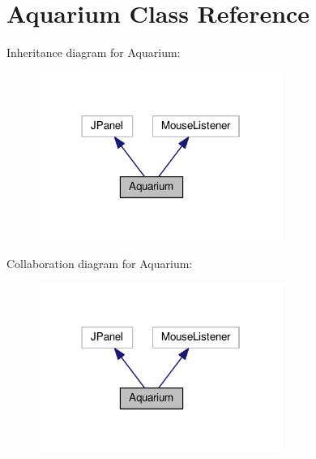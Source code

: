 \hypertarget{class_aquarium}{}\section{Aquarium Class Reference}
\label{class_aquarium}


Inheritance diagram for Aquarium\+:
\nopagebreak
\begin{figure}[H]
\begin{center}
\leavevmode
\includegraphics[width=226pt]{class_aquarium__inherit__graph}
\end{center}
\end{figure}


Collaboration diagram for Aquarium\+:
\nopagebreak
\begin{figure}[H]
\begin{center}
\leavevmode
\includegraphics[width=226pt]{class_aquarium__coll__graph}
\end{center}
\end{figure}
